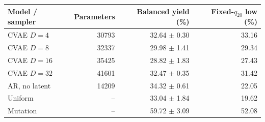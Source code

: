 \begin{center}\small
\begin{tabular}{lrrr}
\toprule
Model / sampler & Parameters & Balanced yield (\%) & Fixed-$q_{20}$ low (\%)\\
\midrule
CVAE $D=4$ & 30793 & 32.64 $\pm$ 0.30 & 33.16\\
CVAE $D=8$ & 32337 & 29.98 $\pm$ 1.41 & 29.34\\
CVAE $D=16$ & 35425 & 28.82 $\pm$ 1.83 & 27.43\\
CVAE $D=32$ & 41601 & 32.47 $\pm$ 0.35 & 31.42\\
AR, no latent & 14209 & 34.32 $\pm$ 0.61 & 22.05\\
Uniform & -- & 33.04 $\pm$ 1.84 & 19.62\\
Mutation & -- & 59.72 $\pm$ 3.09 & 52.08\\
\bottomrule
\end{tabular}
\end{center}
